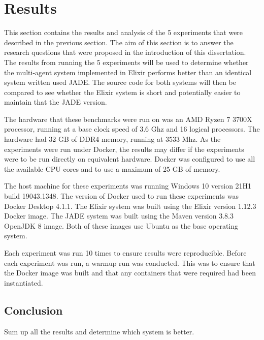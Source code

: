\section{Results}

This section contains the results and analysis of the 5 experiments that were described in the previous section.
The aim of this section is to answer the research questions that were proposed in the introduction of this dissertation.
The results from running the 5 experiments will be used to determine whether the multi-agent system implemented in Elixir performs better than an identical system written used JADE\@.
The source code for both systems will then be compared to see whether the Elixir system is short and potentially easier to maintain that the JADE version.

The hardware that these benchmarks were run on was an AMD Ryzen 7 3700X processor, running at a base clock speed of 3.6 Ghz and 16 logical processors.
The hardware had 32 GB of DDR4 memory, running at 3533 Mhz.
As the experiments were run under Docker, the results may differ if the experiments were to be run directly on equivalent hardware.
Docker was configured to use all the available CPU cores and to use a maximum of 25 GB of memory.

The host machine for these experiments was running Windows 10 version 21H1 build 19043.1348.
The version of Docker used to run these experiments was Docker Desktop 4.1.1.
The Elixir system was built using the Elixir version 1.12.3 Docker image.
The JADE system was built using the Maven version 3.8.3 OpenJDK 8 image.
Both of these images use Ubuntu as the base operating system.

Each experiment was run 10 times to ensure results were reproducible.
Before each experiment was run, a warmup run was conducted.
This was to ensure that the Docker image was built and that any containers that were required had been instantiated.









\subsection{Conclusion}

Sum up all the results and determine which system is better.
